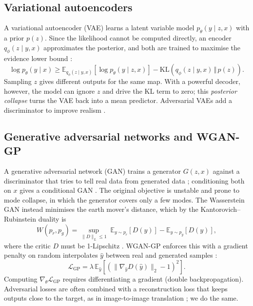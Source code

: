 \documentclass[11pt,a4paper]{article}
\newcommand{\E}{\mathbb{E}}
\begin{document}
\subsection{Variational autoencoders}
A variational autoencoder (VAE) learns a latent variable model $p_\theta(y\mid z,x)$ with a prior $p(z)$.
Since the likelihood cannot be computed directly, an encoder $q_\phi(z\mid y,x)$ approximates the posterior,
and both are trained to maximise the evidence lower bound \citep{kingma2014vae, rezende2014}:
\begin{equation}
  \log p_\theta(y\mid x) \ge \E_{q_\phi(z\mid y,x)}\left[\log p_\theta(y\mid z,x)\right]
  - \mathrm{KL}\left(q_\phi(z\mid y,x)\,\Vert\,p(z)\right).
\end{equation}
Sampling $z$ gives different outputs for the same map. With a powerful decoder, however, the model can
ignore $z$ and drive the KL term to zero; this \emph{posterior collapse} \citep{bowman2016} turns the VAE back
into a mean predictor. Adversarial VAEs add a discriminator to improve realism \citep{plumerault2020}.

\subsection{Generative adversarial networks and WGAN-GP}
A generative adversarial network (GAN) trains a generator $G(z,x)$ against a discriminator that tries to tell
real data from generated data \citep{goodfellow2014}; conditioning both on $x$ gives a conditional GAN
\citep{mirza2014}. The original objective is unstable and prone to mode collapse, in which the generator
covers only a few modes. The Wasserstein GAN instead minimises the earth mover's distance, which by the
Kantorovich--Rubinstein duality is
\begin{equation}
  W(p_r,p_g)=\sup_{\lVert D\rVert_L\le 1}\;\E_{y\sim p_r}[D(y)]-\E_{y\sim p_g}[D(y)],
\end{equation}
where the critic $D$ must be 1-Lipschitz \citep{arjovsky2017}. WGAN-GP enforces this with a gradient penalty
on random interpolates $\hat y$ between real and generated samples \citep{gulrajani2017}:
\begin{equation}
  \mathcal{L}_{\mathrm{GP}} = \lambda\,\E_{\hat y}\left[\left(\lVert\nabla_{\hat y} D(\hat y)\rVert_2-1\right)^2\right].
  \label{eq:gp}
\end{equation}
Computing $\nabla_\theta\mathcal{L}_{\mathrm{GP}}$ requires differentiating a gradient (double backpropagation).
Adversarial losses are often combined with a reconstruction loss that keeps outputs close to the target,
as in image-to-image translation \citep{isola2017}; we do the same.
\end{document}

